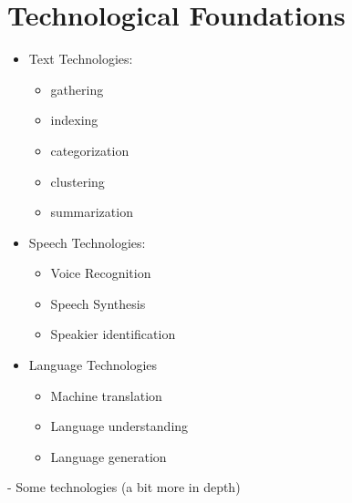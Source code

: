 \documentclass[11pt]{article}
\begin{document}
\section{Technological Foundations}
\begin{itemize}
 \item Text Technologies:
\begin{itemize}
 \item gathering
 \item indexing
 \item categorization
 \item clustering
 \item summarization
\end{itemize}
 \item Speech Technologies:
\begin{itemize}
 \item Voice Recognition
 \item Speech Synthesis
 \item Speakier identification
\end{itemize}
 \item Language Technologies
\begin{itemize}
 \item Machine translation
 \item Language understanding
 \item Language generation
\end{itemize}
\end{itemize}
- Some technologies (a bit more in depth)
\end{document}
